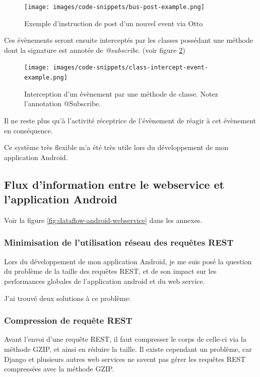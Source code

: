 \documentclass[12pt,table,a4paper]{report}
\begin{document}
\begin{figure}
\centering
\texttt{[image: images/code-snippets/bus-post-example.png]}
\caption{Exemple d'instruction de post d'un nouvel event via Otto}
\label{fig:bus-post-example}
\end{figure}

Ces évènements seront ensuite interceptés par les classes possédant une méthode dont la signature est annotée de \textit{@subscribe}. (voir figure \ref{fig:class-intercept-event-example})

\begin{figure}
\centering
\texttt{[image: images/code-snippets/class-intercept-event-example.png]}
\caption{Interception d'un évènement par une méthode de classe. Notez l'annotation @Subscribe.}
\label{fig:class-intercept-event-example}
\end{figure}

Il ne reste plus qu'à l'activité réceptrice de l'évènement de réagir à cet évènement en conséquence.

Ce système très flexible m'a été très utile lors du développement de mon application Android.


\subsection{Flux d'information entre le webservice et l'application Android}
Voir la figure \ref{fig:dataflow-android-webservice} dans les annexes.


\subsubsection{Minimisation de l'utilisation réseau des requêtes REST} \label{sssec:minimisation-utilisation-reseau}
Lors du développement de mon application Android, je me suis posé la question du problème de la taille des requêtes REST, et de son impact sur les performances globales de l'application android et du web service.

J'ai trouvé deux solutions à ce problème:


\subsubsection{Compression de requête REST}
Avant l'envoi d'une requête REST, il faut compresser le corps de celle-ci via la méthode GZIP, et ainsi en réduire la taille. Il existe cependant un problème, car Django et plusieurs autres web services ne savent pas gérer les requêtes REST compressées avec la méthode GZIP.
\end{document}
